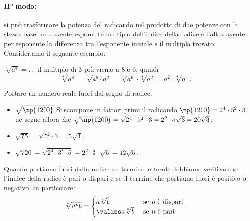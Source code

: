 \paragraph{II° modo:} si può trasformare la potenza del radicando nel prodotto di due potenze con la stessa base; una avente esponente multiplo dell'indice della radice e l'altra avente per esponente la differenza tra l'esponente iniziale e il multiplo trovato. Consideriamo il seguente esempio:

 $\sqrt[3]{a^8}=\ldots\:$ il multiplo di $3$ più vicino a $8$ è $6$, quindi 
\[\sqrt[3]{a^8}=\sqrt[3]{a^6\cdot a^2}=\sqrt[3]{a^6}\cdot \sqrt[3]{a^2}=a^2\cdot \sqrt[3]{a^2}.\]
\pagebreak
\begin{exrig}
 \begin{esempio}
 Portare un numero reale fuori dal segno di radice.
\begin{itemize}
 \item $\sqrt{\np{1200}}$ Si scompone in fattori primi il radicando $\np{1200}=2^4\cdot 5^2\cdot 3$ ne segue allora che $\sqrt{\np{1200}}=\sqrt{2^4\cdot 5^2\cdot 3}=2^2\cdot 5\sqrt 3=20\sqrt 3$;
 \item $\sqrt{75}=\sqrt{5^2\cdot 3}=5\sqrt 3$;
 \item $\sqrt{720}=\sqrt{2^4\cdot 3^2\cdot 5}=2^2\cdot 3\cdot \sqrt 5=12\sqrt 5$.
\end{itemize}
 \end{esempio}
\end{exrig}

Quando portiamo fuori dalla radice un termine letterale dobbiamo verificare se l'indice della radice è pari o dispari e se il termine che portiamo fuori è positivo o negativo. In particolare:
\[
\sqrt[n]{a^nb}=
\begin{cases}
a\sqrt[n]b & \text{ se }n\text{ è dispari}\\
\valass a\sqrt[n]b & \text{ se }n\text{ è pari}
\end{cases}.
\]


